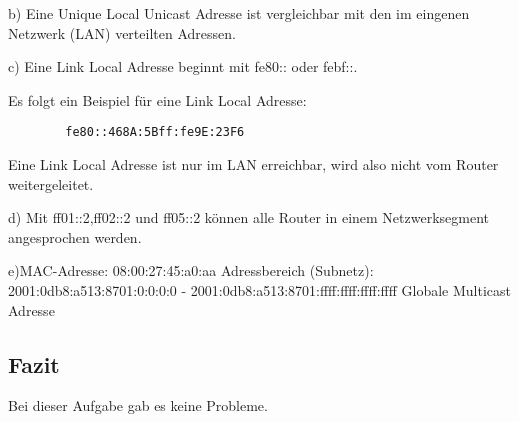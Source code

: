 b) Eine Unique Local Unicast Adresse ist vergleichbar mit den im eingenen Netzwerk (LAN) verteilten Adressen.

c) Eine Link Local Adresse beginnt mit fe80:: oder febf::.

Es folgt ein Beispiel für eine Link Local Adresse:
\begin{lstlisting}
		fe80::468A:5Bff:fe9E:23F6
\end{lstlisting}

Eine Link Local Adresse ist nur im LAN erreichbar, wird also nicht vom Router weitergeleitet.

d) Mit ff01::2,ff02::2 und ff05::2 können alle Router in einem Netzwerksegment angesprochen werden.

e)MAC-Adresse: 08:00:27:45:a0:aa
Adressbereich (Subnetz): 2001:0db8:a513:8701:0:0:0:0 - 2001:0db8:a513:8701:ffff:ffff:ffff:ffff
Globale Multicast Adresse

\subsection{Fazit}
Bei dieser Aufgabe gab es keine Probleme.
